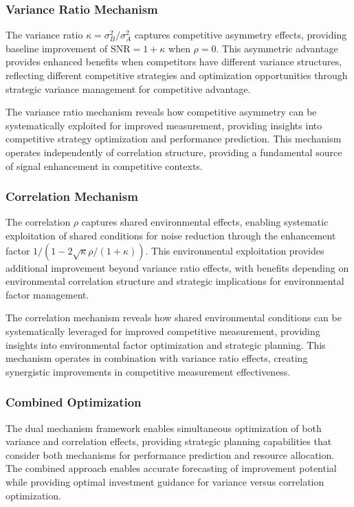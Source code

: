 \subsubsection{Variance Ratio Mechanism}

The variance ratio $\kappa = \sigma_B^2/\sigma_A^2$ captures competitive asymmetry effects, providing baseline improvement of $\text{SNR} = 1 + \kappa$ when $\rho = 0$. This asymmetric advantage provides enhanced benefits when competitors have different variance structures, reflecting different competitive strategies and optimization opportunities through strategic variance management for competitive advantage.

The variance ratio mechanism reveals how competitive asymmetry can be systematically exploited for improved measurement, providing insights into competitive strategy optimization and performance prediction. This mechanism operates independently of correlation structure, providing a fundamental source of signal enhancement in competitive contexts.

\subsubsection{Correlation Mechanism}

The correlation $\rho$ captures shared environmental effects, enabling systematic exploitation of shared conditions for noise reduction through the enhancement factor $1/(1 - 2\sqrt{\kappa}\rho/(1+\kappa))$. This environmental exploitation provides additional improvement beyond variance ratio effects, with benefits depending on environmental correlation structure and strategic implications for environmental factor management.

The correlation mechanism reveals how shared environmental conditions can be systematically leveraged for improved competitive measurement, providing insights into environmental factor optimization and strategic planning. This mechanism operates in combination with variance ratio effects, creating synergistic improvements in competitive measurement effectiveness.

\subsubsection{Combined Optimization}

The dual mechanism framework enables simultaneous optimization of both variance and correlation effects, providing strategic planning capabilities that consider both mechanisms for performance prediction and resource allocation. The combined approach enables accurate forecasting of improvement potential while providing optimal investment guidance for variance versus correlation optimization.

